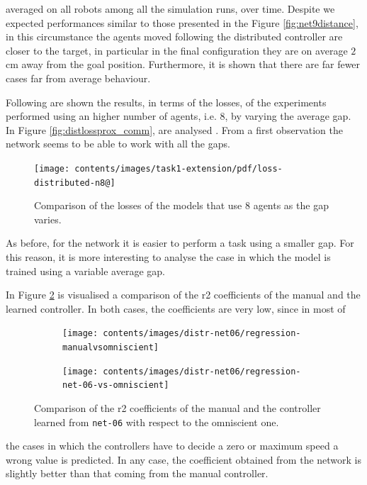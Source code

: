 \noindent
 averaged on all robots among all the simulation runs, over time. 
Despite we expected performances similar to those presented in the Figure 
\ref{fig:net9distance}, in this circumstance the agents moved following the 
distributed controller are closer to the target, in particular in the final 
configuration they are on average $2$ \gls{cm} away from the goal position. 
Furthermore, it is shown that there are far fewer cases far from average 
behaviour.

Following are shown the results, in terms of the losses, of the experiments 
performed using an higher number of agents, i.e. 8, by varying the 
average gap.
In Figure \ref{fig:distlossprox_comm}, are analysed  . From a first observation 
the network seems to be able to work with all the gaps.
\begin{figure}[!htb]
	\centering
	\texttt{[image: contents/images/task1-extension/pdf/loss-distributed-n8@]}%
	\caption{Comparison of the losses of the models that use $8$ agents as 
	the gap 
	varies.}
	\label{fig:distlossn8}
\end{figure}
As before, for the network it is easier to perform a task using a smaller gap.
For this reason, it is more interesting to analyse the case in which the model 
is trained using a variable average gap.

In Figure \ref{fig:net06r2} is visualised a comparison of the \gls{r2} 
coefficients of the manual and the learned controller. In both cases, the 
coefficients are very low, since in most of
\begin{figure}[!htb]
	\centering
	\begin{subfigure}[h]{0.49\textwidth}
		\centering
		\texttt{[image: contents/images/distr-net06/regression-manualvsomniscient]}%
	\end{subfigure}
	\hfill
	\begin{subfigure}[h]{0.49\textwidth}
		\centering
		\texttt{[image: contents/images/distr-net06/regression-net-06-vs-omniscient]}
	\end{subfigure}
	\caption[Evaluation of the \gls{r2} coefficients of \texttt{net-06} 
	.]{Comparison of the \gls{r2} coefficients of the manual and the controller 
	learned from \texttt{net-06} with respect to the omniscient one.}
	\label{fig:net06r2}
\end{figure}

\noindent
the cases in which the controllers have to decide a zero or maximum speed a 
wrong value is predicted.
In any case, the coefficient obtained from the network is slightly better than 
that coming from the manual controller.

